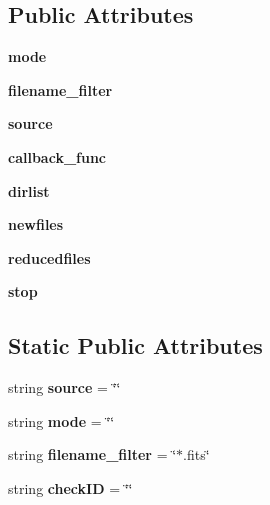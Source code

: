 \subsection*{Public Attributes}
\begin{CompactItemize}
\item 
\textbf{mode}\label{classdatahandler_1_1datacollector_1_1DataCollector_aa6941cb4086fdd8bddf089b7e5aa263}

\item 
\textbf{filename\_\-filter}\label{classdatahandler_1_1datacollector_1_1DataCollector_1009975713d65a6c08d823bc66c6c1cc}

\item 
\textbf{source}\label{classdatahandler_1_1datacollector_1_1DataCollector_31d4c0fcd3938e90f36411bafce18941}

\item 
\textbf{callback\_\-func}\label{classdatahandler_1_1datacollector_1_1DataCollector_4cf290a2679aeff3f48281aa283fb11a}

\item 
\textbf{dirlist}\label{classdatahandler_1_1datacollector_1_1DataCollector_8618f317f810ffa920d1542e7c976d72}

\item 
\textbf{newfiles}\label{classdatahandler_1_1datacollector_1_1DataCollector_e239cb0dc91cb175674db72faf14f14c}

\item 
\textbf{reducedfiles}\label{classdatahandler_1_1datacollector_1_1DataCollector_8698323f82e5336038f9d1588198ebb4}

\item 
\textbf{stop}\label{classdatahandler_1_1datacollector_1_1DataCollector_9a73ad7802722cb49099307f3264b216}

\end{CompactItemize}
\subsection*{Static Public Attributes}
\begin{CompactItemize}
\item 
string \textbf{source} = \char`\"{}\char`\"{}\label{classdatahandler_1_1datacollector_1_1DataCollector_2b91f8b3c4d93067560ec8bc610f6378}

\item 
string \textbf{mode} = \char`\"{}\char`\"{}\label{classdatahandler_1_1datacollector_1_1DataCollector_09c16105e95fd251a43a065f02a4459e}

\item 
string \textbf{filename\_\-filter} = \char`\"{}$\ast$.fits\char`\"{}\label{classdatahandler_1_1datacollector_1_1DataCollector_d326fa039a59b9eb812b1795f5350798}

\item 
string \textbf{check\-ID} = \char`\"{}\char`\"{}\label{classdatahandler_1_1datacollector_1_1DataCollector_597bc752537e346dcd5896b7b37e70a9}

\end{CompactItemize}


